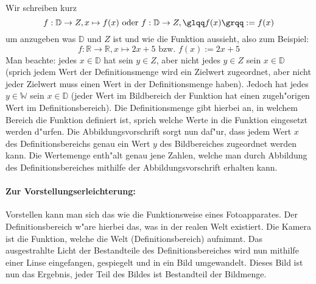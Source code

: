 \begin{flushleft}
Wir schreiben kurz
\begin{equation*}
f : \mathbb{D} \to Z, x \mapsto f(x) \text{ oder } f : \mathbb{D} \to Z, \text{\glqq}f(x)\text{\grqq} := f(x)
\end{equation*}
um anzugeben was $\mathbb{D}$ und $Z$ ist und wie die Funktion aussieht, also zum Beispiel:
\begin{equation*}
f :\mathbb{R} \to \mathbb{R}, x \mapsto 2x + 5 \text{ bzw. } f(x) := 2x + 5
\end{equation*}
Man beachte: jedes $x \in \mathbb{D}$ hat sein $y \in Z$, aber nicht jedes $y \in Z$ sein $x \in \mathbb{D}$ (sprich jedem Wert der Definitionsmenge wird ein Zielwert zugeordnet, aber nicht jeder Zielwert muss einen Wert in der Definitionsmenge haben). Jedoch hat jedes $y \in \mathbb{W}$ sein $x \in \mathbb{D}$ (jeder Wert im Bildbereich der Funktion hat einen zugeh"origen Wert im Definitionsbereich). Die Definitions\-menge gibt hierbei an, in welchem Bereich die Funktion definiert ist, sprich welche Werte \glqq in die Funktion eingesetzt werden d"urfen\grqq . Die Abbildungs\-vorschrift sorgt nun daf"ur, dass jedem Wert $x$ des Definitions\-bereichs genau ein Wert $y$ des Bild\-bereiches zugeordnet werden kann. Die Wertemenge enth"alt genau jene Zahlen, welche man durch Abbildung des Definitions\-bereiches mithilfe der Abbildungs\-vorschrift erhalten kann.

\paragraph{Zur Vorstellungserleichterung:}
Vorstellen kann man sich das wie die Funktionsweise eines Fotoapparates. Der Definitionsbereich w"are hierbei das, was in der realen Welt existiert. Die Kamera ist die Funktion, welche die Welt (Definitionsbereich) aufnimmt. Das ausgestrahlte Licht der Bestandteile des Definitionsbereiches wird nun mithilfe einer Linse eingefangen, gespiegelt und in ein Bild umgewandelt. Dieses Bild ist nun das Ergebnis, jeder Teil des Bildes ist Bestandteil der Bildmenge.
\begin{figure}[h!]
 \centering
\end{figure}
\end{flushleft}
